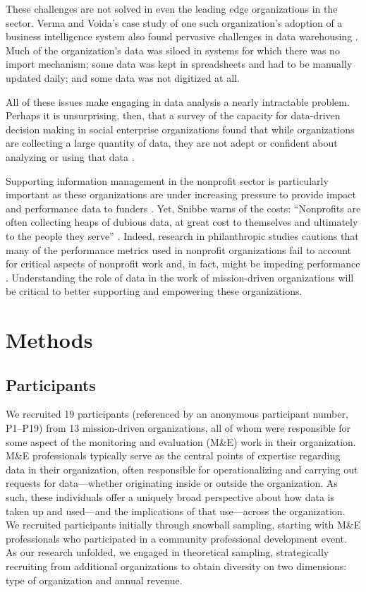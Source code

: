 These challenges are not solved in even the leading edge organizations in the sector. Verma and Voida’s case study of one such organization’s adoption of a business intelligence system also found pervasive challenges in data warehousing \citep{Verma2016DrillDown}. Much of the organization’s data was siloed in systems for which there was no import mechanism; some data was kept in spreadsheets and had to be manually updated daily; and some data was not digitized at all. 

All of these issues make engaging in data analysis a nearly intractable problem. Perhaps it is unsurprising, then, that a survey of the capacity for data-driven decision making in social enterprise organizations found that while organizations are collecting a large quantity of data, they are not adept or confident about analyzing or using that data \citep{Maxwell2016Data}. 

Supporting information management in the nonprofit sector is particularly important as these organizations are under increasing pressure to provide impact and performance data to funders \citep{Haskins2011Building}. Yet, Snibbe warns of the costs: “Nonprofits are often collecting heaps of dubious data, at great cost to themselves and ultimately to the people they serve” \citep{Snibbe2006Drown}. Indeed, research in philanthropic studies cautions that many of the performance metrics used in nonprofit organizations fail to account for critical aspects of nonprofit work and, in fact, might be impeding performance \citep{Benjamin2014Programs}. Understanding the role of data in the work of mission-driven organizations will be critical to better supporting and empowering these organizations.

\section{Methods}
\subsection{Participants}

We recruited 19 participants (referenced by an anonymous participant number, P1–P19) from 13 mission-driven organizations, all of whom were responsible for some aspect of the monitoring and evaluation (M\&E) work in their organization. M\&E professionals typically serve as the central points of expertise regarding data in their organization, often responsible for operationalizing and carrying out requests for data—whether originating inside or outside the organization. As such, these individuals offer a uniquely broad perspective about how data is taken up and used---and the implications of that use---across the organization. We recruited participants initially through snowball sampling, starting with M\&E professionals who participated in a community professional development event. As our research unfolded, we engaged in theoretical sampling, strategically recruiting from additional organizations to obtain diversity on two dimensions: type of organization and annual revenue.

